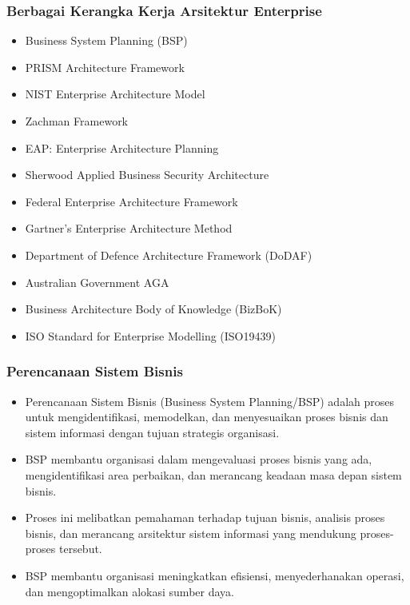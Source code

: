 \documentclass{beamer}
\begin{document}
	
	\begin{frame}
		\frametitle{Berbagai Kerangka Kerja Arsitektur Enterprise}
		\begin{itemize}
			\item Business System Planning (BSP)
			\item PRISM Architecture Framework
			\item NIST Enterprise Architecture Model
			\item Zachman Framework
			\item EAP: Enterprise Architecture Planning
			\item Sherwood Applied Business Security Architecture
			\item Federal Enterprise Architecture Framework
			\item Gartner’s Enterprise Architecture Method
			\item Department of Defence Architecture Framework (DoDAF)
			\item Australian Government AGA
			\item Business Architecture Body of Knowledge (BizBoK)
			\item ISO Standard for Enterprise Modelling (ISO19439)
		\end{itemize}
	\end{frame}
	
	\begin{frame}
		\frametitle{Perencanaan Sistem Bisnis}
		\begin{itemize}
			\item Perencanaan Sistem Bisnis (Business System Planning/BSP) adalah proses untuk mengidentifikasi, memodelkan, dan menyesuaikan proses bisnis dan sistem informasi dengan tujuan strategis organisasi.
			\item BSP membantu organisasi dalam mengevaluasi proses bisnis yang ada, mengidentifikasi area perbaikan, dan merancang keadaan masa depan sistem bisnis.
			\item Proses ini melibatkan pemahaman terhadap tujuan bisnis, analisis proses bisnis, dan merancang arsitektur sistem informasi yang mendukung proses-proses tersebut.
			\item BSP membantu organisasi meningkatkan efisiensi, menyederhanakan operasi, dan mengoptimalkan alokasi sumber daya.
		\end{itemize}
	\end{frame}
	
\end{document}
